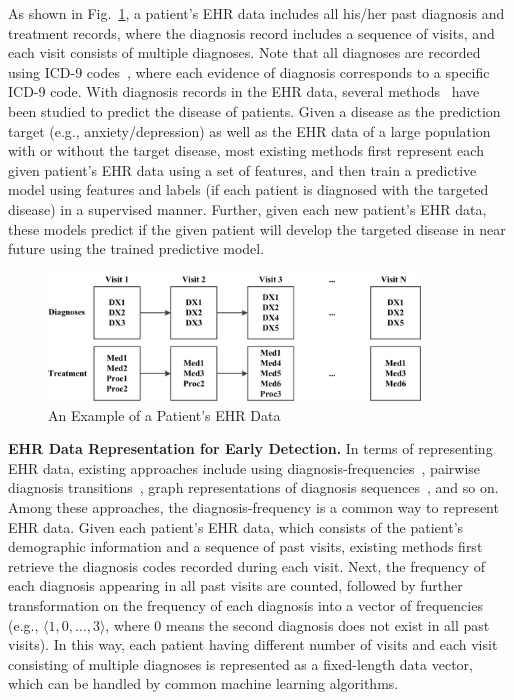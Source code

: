 As shown in Fig.~\ref{fig:exp-ehr}, a patient's EHR data includes all his/her past diagnosis and treatment records, where the diagnosis record includes a sequence of visits, and each visit consists of multiple diagnoses.
Note that all diagnoses are recorded using ICD-9 codes~\cite{dubberke2006icd}, where each evidence of diagnosis corresponds to a specific ICD-9 code.
With diagnosis records in the EHR data, several methods~\cite{personalized2015,amarasingham2010automated,pittman2004integrated,jensen2012mining} have been studied to predict the disease of patients.
Given a disease as the prediction target (e.g., anxiety/depression) as well as the EHR data of a large population with or without the target disease, most existing methods first represent each given patient's EHR data using a set of features, and then train a predictive model using features and labels (if each patient is diagnosed with the targeted disease) in a supervised manner.
Further, given each new patient's EHR data, these models predict if the given patient will develop the targeted disease in near future using the trained predictive model.
 

\begin{figure}
\centering
\includegraphics[width=0.88\textwidth]{./img/Patient.png}
\caption{An Example of a Patient's EHR Data}
\label{fig:exp-ehr}
\end{figure}


\textbf{EHR Data Representation for Early Detection.} In terms of representing EHR data, existing approaches include using diagnosis-frequencies~\cite{sun2012supervised,7091853,personalized2015}, pairwise diagnosis transitions~\cite{zhang_mseq_2015,jensen2001mining}, graph representations of diagnosis sequences~\cite{liu_temporal_2015}, and so on.
Among these approaches, the diagnosis-frequency is a common way to represent EHR data.
Given each patient's EHR data, which consists of the patient's demographic information and a sequence of past visits, existing methods first retrieve the diagnosis codes recorded during each visit.
Next, the frequency of each diagnosis appearing in all past visits are counted, followed by further transformation on the frequency of each diagnosis into a vector of frequencies (e.g., $\langle 1, 0, \dots, 3\rangle$, where 0 means the second diagnosis does not exist in all past visits).
In this way, each patient having different number of visits and each visit consisting of multiple diagnoses is represented as a fixed-length data vector, which can be handled by common machine learning algorithms.
 

